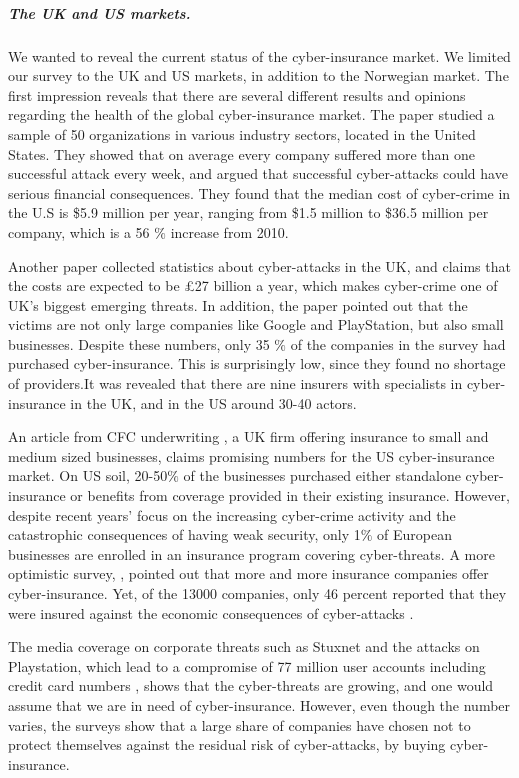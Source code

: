 \subparagraph{The UK and US markets.}
We wanted to reveal the current status of the cyber-insurance market. We limited our survey to the UK and US markets, in addition to the Norwegian market. 
The first impression reveals that there are several different results and opinions regarding the health of the global cyber-insurance market. 
The paper \cite{ccost} studied a sample of 50 organizations in various industry sectors, located in the United States. They showed that on average every company suffered more than one successful attack every week, and argued that successful cyber-attacks could have serious financial consequences. They found that the median cost of cyber-crime in the U.S is \$5.9 million per year, ranging from \$1.5 million to \$36.5 million per company, which is a 56 $\%$ increase from 2010. 
 
 Another paper \cite{evolvingcyber} collected statistics about cyber-attacks in the UK, and claims that the costs are expected to be \pounds 27 billion a year, which makes cyber-crime one of UK's biggest emerging threats. In addition, the paper pointed out that the victims are not only large companies like Google and PlayStation, but also small businesses. Despite these numbers, only 35 $\%$ of the companies in the survey had purchased cyber-insurance. This is surprisingly low, since they found no shortage of providers.It was revealed that there are nine insurers with specialists in cyber-insurance in the UK, and in the US around 30-40 actors.  
 
 
 An article from CFC underwriting \cite{CFCunder}, a UK firm offering insurance to small and medium sized businesses, claims promising numbers for the US cyber-insurance market. On US soil, 20-50$\%$ of the businesses purchased either standalone cyber-insurance or benefits from coverage provided in their existing insurance. However, despite recent years' focus on the increasing cyber-crime activity and the catastrophic consequences of having weak security, only 1$\%$ of European businesses are enrolled in an insurance program covering cyber-threats.
A more optimistic survey, \cite{compworld}, pointed out that more and more insurance companies offer cyber-insurance. Yet, of the 13000 companies, only 46 percent reported that they were insured against the economic consequences of cyber-attacks . 
 
 The media coverage on corporate threats such as Stuxnet and the attacks on Playstation, which lead to a compromise of 77 million user accounts including credit card numbers \cite{playstation}, shows that the cyber-threats are growing, and one would assume that we are in need of cyber-insurance. However, even though the number varies, the surveys show that a large share of companies have chosen not to protect themselves against the residual risk of cyber-attacks, by buying cyber-insurance.

